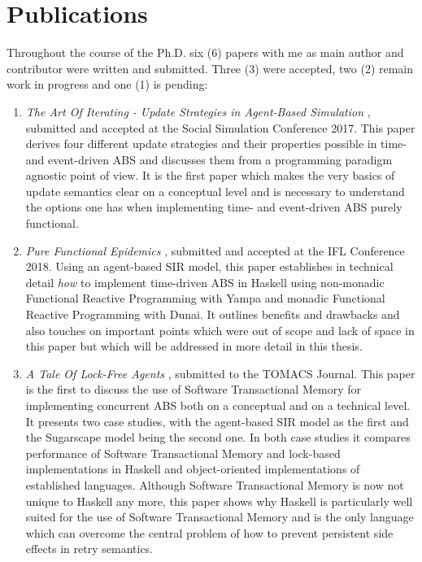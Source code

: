 \section*{Publications}
Throughout the course of the Ph.D. six (6) papers with me as main author and contributor were written and submitted. Three (3) were accepted, two (2) remain work in progress and one (1) is pending:

\begin{enumerate}
	\item \textit{The Art Of Iterating - Update Strategies in Agent-Based Simulation} \cite{thaler_art_2017, payne_social_2019}, submitted and accepted at the Social Simulation Conference 2017. This paper derives four different update strategies and their properties possible in time- and event-driven ABS and discusses them from a programming paradigm agnostic point of view. It is the first paper which makes the very basics of update semantics clear on a conceptual level and is necessary to understand the options one has when implementing time- and event-driven ABS purely functional.
	
	\item \textit{Pure Functional Epidemics} \cite{thaler_pure_2018}, submitted and accepted at the IFL Conference 2018. Using an agent-based SIR model, this paper establishes in technical detail \textit{how} to implement time-driven ABS in Haskell using non-monadic Functional Reactive Programming with Yampa and monadic Functional Reactive Programming with Dunai. It outlines benefits and drawbacks and also touches on important points which were out of scope and lack of space in this paper but which will be addressed in more detail in this thesis.
	
	\item \textit{A Tale Of Lock-Free Agents} \cite{thaler_tale_2018}, submitted to the TOMACS Journal. This paper is the first to discuss the use of Software Transactional Memory for implementing concurrent ABS both on a conceptual and on a technical level. It presents two case studies, with the agent-based SIR model as the first and the Sugarscape model being the second one. In both case studies it compares performance of Software Transactional Memory and lock-based implementations in Haskell and object-oriented implementations of established languages. Although Software Transactional Memory is now not unique to Haskell any more, this paper shows why Haskell is particularly well suited for the use of Software Transactional Memory and is the only language which can overcome the central problem of how to prevent persistent side effects in retry semantics.


\end{enumerate}
